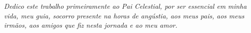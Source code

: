 \begin{dedicatoria}
   \vspace*{\fill}
   \centering
   \noindent
   \textit{Dedico este trabalho primeiramente ao Pai Celestial, por ser essencial em minha vida, meu guia, socorro presente na horas de angústia, aos meus pais, aos meus irmãos, aos amigos que fiz nesta jornada e ao meu amor. } \vspace*{\fill}
\end{dedicatoria}
